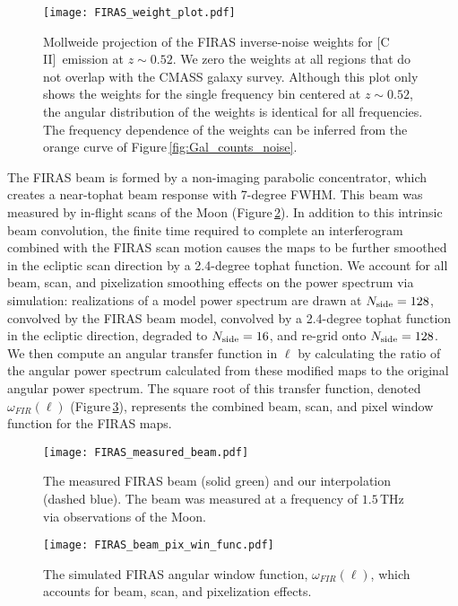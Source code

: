 \documentclass[fleqn,usenatbib]{mnras}
\newcommand{\cii}{[C{\sc\,II}]}
\begin{document}
\begin{figure}
  \texttt{[image: FIRAS\_weight\_plot.pdf]}
  \caption{ \label{fig:FIRAS_weights} Mollweide projection of the FIRAS inverse-noise weights for \cii\ emission at $z\sim0.52$. We zero the weights at all regions that do not overlap with the CMASS galaxy survey. Although this plot only shows the weights for the single frequency bin centered at $z\sim0.52$, the angular distribution of the weights is identical for all frequencies. The frequency dependence of the weights can be inferred from the orange curve of Figure\,\ref{fig:Gal_counts_noise}.}
\end{figure}

The FIRAS beam is formed by a non-imaging parabolic concentrator, which creates a near-tophat beam response with 7-degree FWHM. This beam was measured by in-flight scans of the Moon (Figure\,\ref{fig:FIRAS_beam}). In addition to this intrinsic beam convolution, the finite time required to complete an interferogram combined with the FIRAS scan motion causes the maps to be further smoothed in the ecliptic scan direction by a 2.4-degree tophat function. We account for all beam, scan, and pixelization smoothing effects on the power spectrum via simulation: realizations of a model power spectrum are drawn at $N_{\rm side}=128$, convolved by the FIRAS beam model, convolved by a 2.4-degree tophat function in the ecliptic direction, degraded to $N_{\rm side}=16$, and re-grid onto $N_{\rm side}=128$. We then compute an angular transfer function in $\ell$ by calculating the ratio of the angular power spectrum calculated from these modified maps to the original angular power spectrum. The square root of this transfer function, denoted $\omega_{FIR}(\ell)$ (Figure\,\ref{fig:FIRAS_win}), represents the combined beam, scan, and pixel window function for the FIRAS maps. 

\begin{figure}
  \texttt{[image: FIRAS\_measured\_beam.pdf]}
  \caption{ \label{fig:FIRAS_beam}The measured FIRAS beam (solid green) and our interpolation (dashed blue). The beam was measured at a frequency of $1.5$\,THz via observations of the Moon.}
\end{figure}

\begin{figure}
  \texttt{[image: FIRAS\_beam\_pix\_win\_func.pdf]}
  \caption{ \label{fig:FIRAS_win}The simulated FIRAS angular window function, $\omega_{FIR}(\ell)$, which accounts for beam, scan, and pixelization effects.}
\end{figure}
\end{document}
